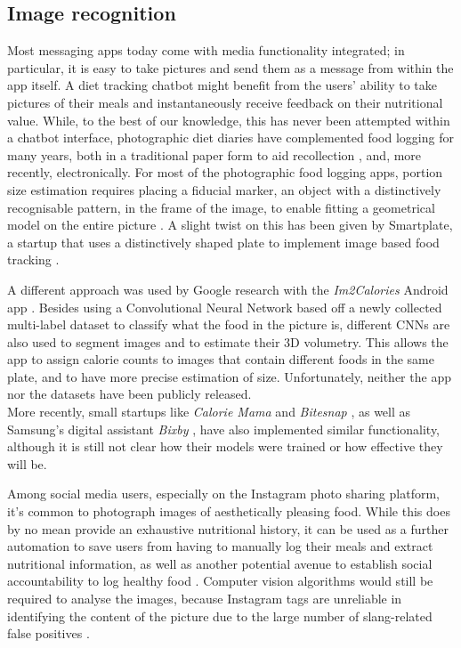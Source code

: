 \subsection{Image recognition}
Most messaging apps today come with media functionality integrated; in particular, it is easy to take pictures and send them as a message from within the app itself. A diet tracking chatbot might benefit from the users' ability to take pictures of their meals and instantaneously receive feedback on their nutritional value. While, to the best of our knowledge, this has never been attempted within a chatbot interface, photographic diet diaries have complemented food logging for many years, both in a traditional paper form to aid recollection \cite{Higgins2009}, and, more recently, electronically. For most of the photographic food logging apps, portion size estimation requires placing a fiducial marker, an object with a distinctively recognisable pattern, in the frame of the image, to enable fitting a geometrical model on the entire picture \cite{Ahmad2016}. A slight twist on this has been given by Smartplate, a startup that uses a distinctively shaped plate to implement image based food tracking \cite{smartplate}.

A different approach was used by Google research with the \textit{Im2Calories} Android app \cite{Myers2015}. Besides using a Convolutional Neural Network based off a newly collected multi-label dataset to classify what the food in the picture is, different CNNs are also used to segment images and to estimate their 3D volumetry. This allows the app to assign calorie counts to images that contain different foods in the same plate, and to have more precise estimation of size. Unfortunately, neither the app nor the datasets have been publicly released.\\
More recently, small startups like \textit{Calorie Mama} \cite{caloriemamaai} and \textit{Bitesnap} \cite{bitesnap}, as well as Samsung's digital assistant \textit{Bixby} \cite{bixbyarticle}, have also implemented similar functionality, although it is still not clear how their models were trained or how effective they will be. 

Among social media users, especially on the Instagram photo sharing platform, it's common to photograph images of aesthetically pleasing food. While this does by no mean provide an exhaustive nutritional history, it can be used as a further automation to save users from having to manually log their meals and extract nutritional information, as well as another potential avenue to establish social accountability to log healthy food \cite{Sharma:2015:MCN:2740908.2742754}. Computer vision algorithms would still be required to analyse the images, because Instagram tags are unreliable in identifying the content of the picture due to the large number of slang-related false positives \cite{hospedales2016}.
